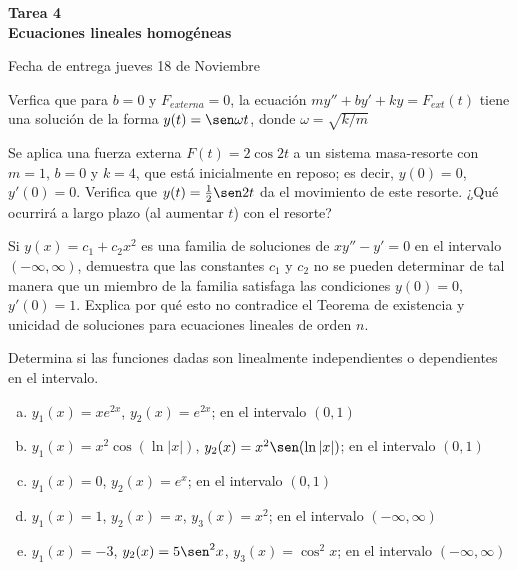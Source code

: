 \documentclass[12pt]{exam}
\begin{document}
\centering


\Large 
\textbf{\huge Tarea 4\\ \large Ecuaciones lineales homogéneas}

\small
Fecha de entrega jueves 18 de Noviembre
\vskip10pt

\normalsize

\pointformat{\bfseries\boldmath(\thepoints)}
\vskip10pt

    
    \begin{questions}
     \question%
     Verfica que para $b=0$ y $F_{externa}=0$, la ecuación $my''+by'+ky=F_{ext}(t)$ tiene una solución de la forma $y(t)=\sen \omega t$, donde $\omega=\sqrt{k/m}$
     

     \question%
     Se aplica una fuerza externa $F(t)=2\cos2t$ a un sistema masa-resorte con $m=1$, $b=0$ y $k=4$, que está inicialmente en reposo; es decir, $y(0)=0$, $y'(0)=0$. Verifica que $y(t)=\frac{1}{2}\sen2t$ da el movimiento de este resorte. ¿Qué ocurrirá a largo plazo (al aumentar $t$) con el resorte?

     
     \question%
      Si $y(x)=c_1+c_2x^2$ es una familia de soluciones de $xy''-y'=0$ en el intervalo $(-\infty,\infty)$, demuestra que las constantes $c_1$ y $c_2$ no se pueden determinar de tal manera que un miembro de la familia satisfaga las condiciones $y(0)=0$, $y'(0)=1$. Explica  por qué esto no contradice el Teorema de existencia y unicidad de soluciones para ecuaciones lineales de orden $n$.
     


     \question%
     Determina si las funciones dadas son linealmente independientes o dependientes en el intervalo.
     \begin{enumerate}[a)]
         \item $y_1(x)=xe^{2x}$, $y_2(x)=e^{2x}$; en el intervalo $(0,1)$
         \item $y_1(x)=x^2\cos(\ln|x|)$, $y_2(x)=x^2\sen(\ln|x|)$; en el intervalo $(0,1)$
         \item $y_1(x)=0$, $y_2(x)=e^x$; en el intervalo $(0,1)$
         \item $y_1(x)=1$, $y_2(x)=x$, $y_3(x)=x^2$; en el intervalo $(-\infty,\infty)$
         \item $y_1(x)=-3$, $y_2(x)=5\sen^2x$, $y_3(x)=\cos^2x$; en el intervalo $(-\infty,\infty)$
     \end{enumerate}






\end{questions}
\end{document}
